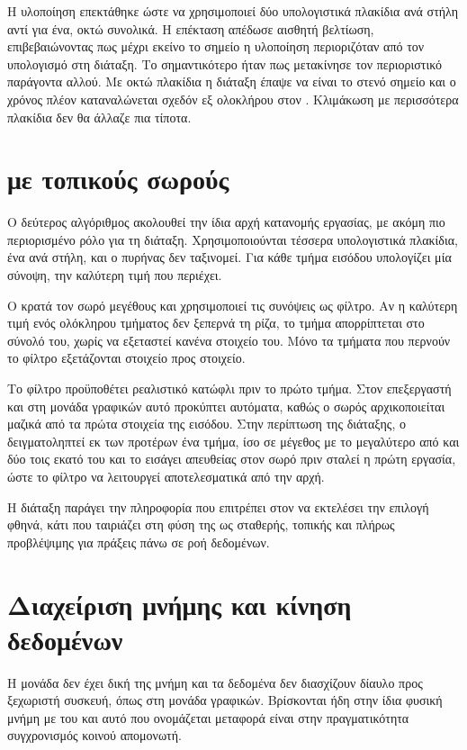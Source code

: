 Η υλοποίηση επεκτάθηκε ώστε να χρησιμοποιεί δύο υπολογιστικά πλακίδια ανά στήλη
αντί για ένα, οκτώ συνολικά. Η επέκταση απέδωσε αισθητή βελτίωση,
επιβεβαιώνοντας πως μέχρι εκείνο το σημείο η υλοποίηση περιοριζόταν από τον
υπολογισμό στη διάταξη. Το σημαντικότερο ήταν πως μετακίνησε τον περιοριστικό
παράγοντα αλλού. Με οκτώ πλακίδια η διάταξη έπαψε να είναι το στενό σημείο και
ο χρόνος πλέον καταναλώνεται σχεδόν εξ ολοκλήρου στον . Κλιμάκωση με
περισσότερα πλακίδια δεν θα άλλαζε πια τίποτα.

\section{ με τοπικούς σωρούς}
\label{sec:npu-mapreduce}

Ο δεύτερος αλγόριθμος ακολουθεί την ίδια αρχή κατανομής εργασίας, με ακόμη πιο
περιορισμένο ρόλο για τη διάταξη. Χρησιμοποιούνται τέσσερα υπολογιστικά
πλακίδια, ένα ανά στήλη, και ο πυρήνας δεν ταξινομεί. Για κάθε τμήμα εισόδου
υπολογίζει μία σύνοψη, την καλύτερη τιμή που περιέχει.

Ο  κρατά τον σωρό μεγέθους  και χρησιμοποιεί τις συνόψεις ως
φίλτρο. Αν η καλύτερη τιμή ενός ολόκληρου τμήματος δεν ξεπερνά τη ρίζα, το
τμήμα απορρίπτεται στο σύνολό του, χωρίς να εξεταστεί κανένα στοιχείο του. Μόνο
τα τμήματα που περνούν το φίλτρο εξετάζονται στοιχείο προς στοιχείο.

Το φίλτρο προϋποθέτει ρεαλιστικό κατώφλι πριν το πρώτο τμήμα. Στον επεξεργαστή
και στη μονάδα γραφικών αυτό προκύπτει αυτόματα, καθώς ο σωρός αρχικοποιείται
μαζικά από τα πρώτα  στοιχεία της εισόδου. Στην περίπτωση της διάταξης, ο
 δειγματοληπτεί εκ των προτέρων ένα τμήμα, ίσο σε μέγεθος με το
μεγαλύτερο από  και δύο τοις εκατό του  και το εισάγει απευθείας
στον σωρό πριν σταλεί η πρώτη εργασία, ώστε το φίλτρο να λειτουργεί
αποτελεσματικά από την αρχή.

Η διάταξη παράγει την πληροφορία που επιτρέπει στον  να εκτελέσει την
επιλογή φθηνά, κάτι που ταιριάζει στη φύση της ως σταθερής, τοπικής και πλήρως
προβλέψιμης για πράξεις πάνω σε ροή δεδομένων.

\section{Διαχείριση μνήμης και κίνηση δεδομένων}
\label{sec:npu-memory}

Η μονάδα δεν έχει δική της μνήμη και τα δεδομένα δεν διασχίζουν δίαυλο προς
ξεχωριστή συσκευή, όπως στη μονάδα γραφικών. Βρίσκονται ήδη στην ίδια φυσική
μνήμη με του  και αυτό που ονομάζεται μεταφορά είναι στην
πραγματικότητα συγχρονισμός κοινού απομονωτή.

